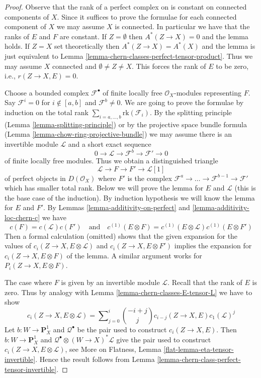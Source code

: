 \begin{proof}
Observe that the rank of a perfect complex on is constant on connected
components of $X$. Since it suffices to prove the formulae for each
connected component of $X$ we may assume $X$ is connected. In particular
we have that the ranks of $E$ and $F$ are constant.
If $Z = \emptyset$ then $A^*(Z \to X) = 0$ and the lemma holds.
If $Z = X$ set theoretically then $A^*(Z \to X) = A^*(X)$ and the
lemma is just equivalent to
Lemma \ref{lemma-chern-classes-perfect-tensor-product}.
Thus we may assume $X$ connected and $\emptyset \not = Z \not = X$.
This forces the rank of $E$ to be zero, i.e., $r(Z \to X, E) = 0$.

\medskip\noindent
Choose a bounded complex $\mathcal{F}^\bullet$ of finite locally free
$\mathcal{O}_X$-modules representing $F$. Say $\mathcal{F}^i = 0$
for $i \not \in [a, b]$ and $\mathcal{F}^b \not = 0$. We are going to prove the
formulae by induction on the total rank
$\sum_{i = a, \ldots, b} \text{rk}(\mathcal{F}_i)$.
By the splitting principle (Lemma \ref{lemma-splitting-principle}) or by
the projective space bundle formula
(Lemma \ref{lemma-chow-ring-projective-bundle})
we may assume there is an invertible module $\mathcal{L}$ and
a short exact sequence
$$
0 \to \mathcal{L} \to \mathcal{F}^b \to \mathcal{F}' \to 0
$$
of finite locally free modules. Thus we obtain a distinguished triangle
$$
\mathcal{L} \to F \to F' \to \mathcal{L}[1]
$$
of perfect objects in $D(\mathcal{O}_X)$ where $F'$ is the complex
$\mathcal{F}^a \to \ldots \to \mathcal{F}^{b - 1} \to \mathcal{F}'$
which has smaller total rank. Below we will prove the lemma for
$E$ and $\mathcal{L}$ (this is the base case of the induction).
By induction hypothesis we will know the lemma for $E$ and $F'$.
By Lemmas \ref{lemma-additivity-on-perfect} and
\ref{lemma-additivity-loc-chern-c} we have
$$
c(F) =
c(\mathcal{L}) c(F')
\quad\text{and}\quad
c^{(1)}(E \otimes F) =
c^{(1)}(E \otimes \mathcal{L}) c^{(1)}(E \otimes F')
$$
Then a formal calculation (omitted) shows that the given expansion for
the values of $c_i(Z \to X, E \otimes \mathcal{L})$ and
$c_i(Z \to X, E \otimes F')$ implies the expansion for
$c_i(Z \to X, E \otimes F)$ of the lemma.
A similar argument works for $P_i(Z \to X, E \otimes F)$.

\medskip\noindent
The case where $F$ is given by an invertible module $\mathcal{L}$.
Recall that the rank of $E$ is zero. Thus by analogy with
Lemma \ref{lemma-chern-classes-E-tensor-L} we have to show
$$
c_i(Z \to X, E \otimes \mathcal{L}) =
\sum\nolimits_{j = 0}^i
\binom{- i + j}{j} c_{i - j}(Z \to X, E) c_1(\mathcal{L})^j
$$
Let $b : W \to \mathbf{P}^1_X$ and $\mathcal{Q}^\bullet$ be the
pair used to construct $c_i(Z \to X, E)$. Then $b : W \to \mathbf{P}^1_X$ and
$\mathcal{Q}^\bullet \otimes (W \to X)^*\mathcal{L}$
give the pair used to construct $c_i(Z \to X, E \otimes \mathcal{L})$,
see More on Flatness, Lemma \ref{flat-lemma-eta-tensor-invertible}.
Hence the result follows from
Lemma \ref{lemma-chern-class-perfect-tensor-invertible}.
\end{proof}






